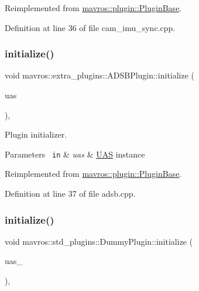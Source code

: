 Reimplemented from \mbox{\hyperlink{group__plugin_gad5313a41da4d26acbbabf008cdc21e82}{mavros\+::plugin\+::\+Plugin\+Base}}.



Definition at line 36 of file cam\+\_\+imu\+\_\+sync.\+cpp.

\mbox{\label{group__plugin_ga15664310460e851e8bb761ce18c68677}} 
\subsubsection{\texorpdfstring{initialize()}{initialize()}\hspace{0.1cm}{\footnotesize\ttfamily [12/41]}}
{\footnotesize\ttfamily void mavros\+::extra\+\_\+plugins\+::\+A\+D\+S\+B\+Plugin\+::initialize (\begin{DoxyParamCaption}\item[{\mbox{\hyperlink{classmavros_1_1UAS}{U\+AS}} \&}]{uas }\end{DoxyParamCaption})\hspace{0.3cm}{\ttfamily [inline]}, {\ttfamily [virtual]}}



Plugin initializer. 


\begin{DoxyParams}[1]{Parameters}
\mbox{\texttt{ in}}  & {\em uas} & {\ttfamily \mbox{\hyperlink{classmavros_1_1UAS}{U\+AS}}} instance \\
\hline
\end{DoxyParams}


Reimplemented from \mbox{\hyperlink{group__plugin_gad5313a41da4d26acbbabf008cdc21e82}{mavros\+::plugin\+::\+Plugin\+Base}}.



Definition at line 37 of file adsb.\+cpp.

\mbox{\label{group__plugin_gaea785dd0427ba4c5f2c0de94da43285f}} 
\subsubsection{\texorpdfstring{initialize()}{initialize()}\hspace{0.1cm}{\footnotesize\ttfamily [13/41]}}
{\footnotesize\ttfamily void mavros\+::std\+\_\+plugins\+::\+Dummy\+Plugin\+::initialize (\begin{DoxyParamCaption}\item[{\mbox{\hyperlink{classmavros_1_1UAS}{U\+AS}} \&}]{uas\+\_\+ }\end{DoxyParamCaption})\hspace{0.3cm}{\ttfamily [inline]}, {\ttfamily [virtual]}}

